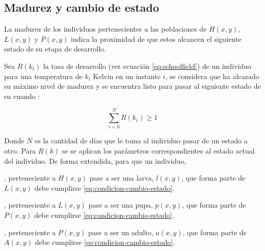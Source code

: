 \subsection{Madurez y cambio de estado}
\label{subsec:cap4-madurez-cambio-estado}
La madurez de los individuos pertenecientes a las poblaciones de $H(x,y)$, $L(x,y)$ y $P(x,y)$
indica la proximidad de que estos alcancen el siguiente estado de su etapa de desarrollo.

Sea $R(k_{i})$ la tasa de desarrollo (ver ecuación \eqref{eq:schoolfield}) de un individuo para
una temperatura de $k_{i}$ Kelvin en un instante $i$, se considera que ha alcazado su máximo nivel
de madurez y se encuentra listo para pasar al siguiente estado de su cuando :

\begin{equation}
\label{eq:condicion-cambio-estado}
    \sum_{i=0}^{N} R(k_{i}) \geq 1
\end{equation}

Donde $N$ es la cantidad de días que le toma al individuo pasar de un estado a otro. Para $R(k)$ se
se aplican los parámetros correspondientes al estado actual del individuo. De forma extendida,
para que un individuo,

\begin{description}[style=multiline,leftmargin=1.5cm]
\item[$h(x,y)$], perteneciente a $H(x,y)$ pase a ser una larva, $l(x,y)$, que forma
parte de $L(x,y)$ debe cumplirse \eqref{eq:condicion-cambio-estado}.

\item[$l(x,y)$], perteneciente a $L(x,y)$ pase a ser una pupa, $p(x,y)$, que forma
parte de $P(x,y)$ debe cumplirse \eqref{eq:condicion-cambio-estado}.

\item[$p(x,y)$], perteneciente a $P(x,y)$ pase a ser un adulto, $a(x,y)$, que forma
parte de $A(x,y)$ debe cumplirse \eqref{eq:condicion-cambio-estado}.
\end{description}




